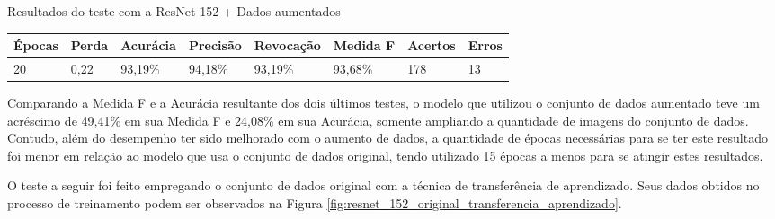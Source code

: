 \documentclass[
	12pt,				%
	oneside,			%
	a4paper,			%
	english,			%
	brazil				%
	]{abntex2ppgsi}
\begin{document}
\begin{quadro}[H]
\caption{Resultados do teste com a ResNet-152 + Dados aumentados}
\label{quad:resultados_teste_resnet_152_com_dados_aumentados}
\centering
\begin{tabular}{|l|l|l|l|l|l|l|l|}
\cline{1-8}
Épocas & Perda & Acurácia & Precisão & Revocação & Medida F & Acertos & Erros \\ \hline
20 & 0,22 & 93,19\% & 94,18\% & 93,19\% & 93,68\% & 178 & 13 \\
\cline{1-8}
\end{tabular}
\end{quadro}

Comparando a Medida F e a Acurácia resultante dos dois últimos testes, o modelo que utilizou o conjunto de dados aumentado teve um acréscimo de 49,41\% em sua Medida F e 24,08\% em sua Acurácia, somente ampliando a quantidade de imagens do conjunto de dados. Contudo, além do desempenho ter sido melhorado com o aumento de dados, a quantidade de épocas necessárias para se ter este resultado foi menor em relação ao modelo que usa o conjunto de dados original, tendo utilizado 15 épocas a menos para se atingir estes resultados.

O teste a seguir foi feito empregando o conjunto de dados original com a técnica de transferência de aprendizado. Seus dados obtidos no processo de treinamento podem ser observados na Figura \ref{fig:resnet_152_original_transferencia_aprendizado}.
\end{document}
